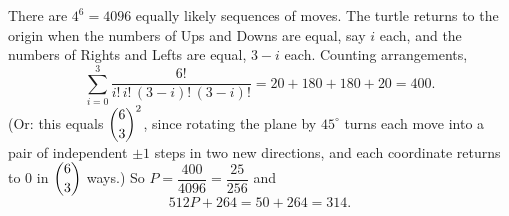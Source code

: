 There are $4^6=4096$ equally likely sequences of moves. The turtle returns to the origin when the numbers of Ups and Downs are equal, say $i$ each, and the numbers of Rights and Lefts are equal, $3-i$ each. Counting arrangements,
\[
\sum_{i=0}^{3}\dfrac{6!}{i!\,i!\,(3-i)!\,(3-i)!}=20+180+180+20=400 .
\]
(Or: this equals $\dbinom63^2$, since rotating the plane by $45^\circ$ turns each move into a pair of independent $\pm1$ steps in two new directions, and each coordinate returns to $0$ in $\dbinom63$ ways.) So $P=\dfrac{400}{4096}=\dfrac{25}{256}$ and
\[
512P+264=50+264=\boxed{314}.
\]
